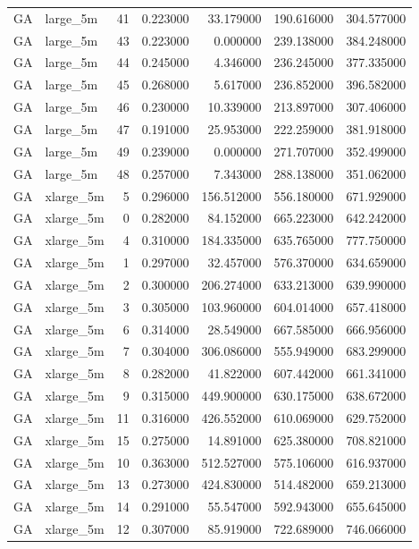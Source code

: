 \begin{tabular}{llrrrrr}
GA & large_5m & 41 & 0.223000 & 33.179000 & 190.616000 & 304.577000 \\
GA & large_5m & 43 & 0.223000 & 0.000000 & 239.138000 & 384.248000 \\
GA & large_5m & 44 & 0.245000 & 4.346000 & 236.245000 & 377.335000 \\
GA & large_5m & 45 & 0.268000 & 5.617000 & 236.852000 & 396.582000 \\
GA & large_5m & 46 & 0.230000 & 10.339000 & 213.897000 & 307.406000 \\
GA & large_5m & 47 & 0.191000 & 25.953000 & 222.259000 & 381.918000 \\
GA & large_5m & 49 & 0.239000 & 0.000000 & 271.707000 & 352.499000 \\
GA & large_5m & 48 & 0.257000 & 7.343000 & 288.138000 & 351.062000 \\
GA & xlarge_5m & 5 & 0.296000 & 156.512000 & 556.180000 & 671.929000 \\
GA & xlarge_5m & 0 & 0.282000 & 84.152000 & 665.223000 & 642.242000 \\
GA & xlarge_5m & 4 & 0.310000 & 184.335000 & 635.765000 & 777.750000 \\
GA & xlarge_5m & 1 & 0.297000 & 32.457000 & 576.370000 & 634.659000 \\
GA & xlarge_5m & 2 & 0.300000 & 206.274000 & 633.213000 & 639.990000 \\
GA & xlarge_5m & 3 & 0.305000 & 103.960000 & 604.014000 & 657.418000 \\
GA & xlarge_5m & 6 & 0.314000 & 28.549000 & 667.585000 & 666.956000 \\
GA & xlarge_5m & 7 & 0.304000 & 306.086000 & 555.949000 & 683.299000 \\
GA & xlarge_5m & 8 & 0.282000 & 41.822000 & 607.442000 & 661.341000 \\
GA & xlarge_5m & 9 & 0.315000 & 449.900000 & 630.175000 & 638.672000 \\
GA & xlarge_5m & 11 & 0.316000 & 426.552000 & 610.069000 & 629.752000 \\
GA & xlarge_5m & 15 & 0.275000 & 14.891000 & 625.380000 & 708.821000 \\
GA & xlarge_5m & 10 & 0.363000 & 512.527000 & 575.106000 & 616.937000 \\
GA & xlarge_5m & 13 & 0.273000 & 424.830000 & 514.482000 & 659.213000 \\
GA & xlarge_5m & 14 & 0.291000 & 55.547000 & 592.943000 & 655.645000 \\
GA & xlarge_5m & 12 & 0.307000 & 85.919000 & 722.689000 & 746.066000 \\

\end{tabular}
